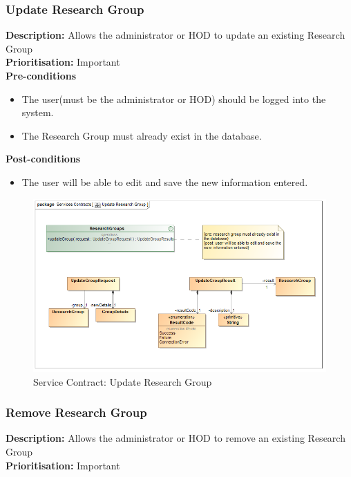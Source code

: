 \documentclass[a4paper]{article}
\begin{document}
	\pagebreak
	\subsubsection{Update Research Group}
	\textbf{Description:} Allows the administrator or HOD to update an existing Research Group\\
	\textbf{Prioritisation:} Important\\
	
	\textbf{Pre-conditions}
	 \begin{itemize}
		\item The user(must be the administrator or HOD) should be logged into the system.
		\item The Research Group must already exist in the database.
	\end{itemize}
	
	\textbf{Post-conditions}
	 \begin{itemize}
		\item The user will be able to edit and save the new information entered.
	\end{itemize}
	
	    	\begin{figure}[H]
	    		\centering
	    		\includegraphics[width=\textwidth]{5.1.13.Update.Research.Group.Services.Contract.png}
	    		\caption{Service Contract: Update Research Group}
	    	\end{figure}
	
	\pagebreak
	\subsubsection{Remove Research Group}
	\textbf{Description:} Allows the administrator or HOD to remove an existing Research Group\\
	\textbf{Prioritisation:} Important\\
	
\end{document}
